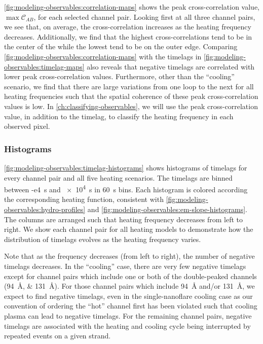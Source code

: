 \autoref{fig:modeling-observables:correlation-maps} shows the peak cross-correlation value, $\max\mathcal{C}_{AB}$, for each selected channel pair. Looking first at all three channel pairs, we see that, on average, the cross-correlation increases as the heating frequency decreases. Additionally, we find that the highest cross-correlations tend to be in the center of the \AR{} while the lowest tend to be on the outer edge. Comparing \autoref{fig:modeling-observables:correlation-maps} with the timelags in \autoref{fig:modeling-observables:timelag-maps} also reveals that negative timelags are correlated with lower peak cross-correlation values. Furthermore, other than the ``cooling'' scenario, we find that there are large variations from one loop to the next for all heating frequencies such that the spatial coherence of these peak cross-correlation values is low. In \autoref{ch:classifying-observables}, we will use the peak cross-correlation value, in addition to the timelag, to classify the heating frequency in each observed pixel.

\subsubsection{Histograms}\label{sec:modeling-observables:histograms}

\autoref{fig:modeling-observables:timelag-histograms} shows histograms of timelags for every channel pair and all five heating scenarios. The timelags are binned between \SI{-e4}{\second} and \SI{e4}{\second} in \SI{60}{\second} bins. Each histogram is colored according the corresponding heating function, consistent with \autoref{fig:modeling-observables:hydro-profiles} and \autoref{fig:modeling-observables:em-slope-histograms}. The columns are arranged such that heating frequency decreases from left to right. We show each channel pair for all heating models to demonstrate how the distribution of timelags evolves as the heating frequency varies.

Note that as the frequency decreases (from left to right), the number of negative timelags decreases. In the ``cooling'' case, there are very few negative timelags except for channel pairs which include one or both of the double-peaked channels (\SIlist{94;131}{\angstrom}). For those channel pairs which include \SI{94}{\angstrom} and/or \SI{131}{\angstrom}, we expect to find negative timelags, even in the single-nanoflare cooling case as our convention of ordering the ``hot'' channel first has been violated such that cooling plasma can lead to negative timelags. For the remaining channel pairs, negative timelags are associated with the heating and cooling cycle being interrupted by repeated events on a given strand.


